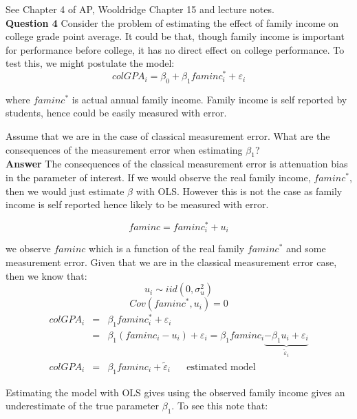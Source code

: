 \documentclass[12pt, oneside]{article}   	%
\begin{document}
See Chapter 4 of AP, Wooldridge Chapter 15 and lecture notes. \\


\indent  \textbf{Question 4 } Consider the problem of estimating the effect of family income on college grade point
average. It could be that, though family income is important for performance before
college, it has no direct effect on college performance. To test this, we might postulate
the model:\\

\[
colGPA_i =\beta_0 +\beta_1 faminc^{*}_i+\varepsilon_i
\]

where $faminc^{*}$ is actual annual family income.  Family income is self reported by students, hence
could be easily measured with error.  

Assume that we are in the case of classical measurement error. What are the consequences of the measurement error when estimating $\beta_1$?\\

\textbf{Answer} 
The consequences of the classical measurement error is attenuation bias in the parameter of interest.
If we would observe the real family income,  $faminc^{*}$, then we would just estimate $\beta$ with OLS. However this is not the case as family income is self reported hence likely to be measured with error.

\[
faminc= faminc^{*}_i+ u_i
\]


 we observe $faminc$ which is a function of the real family $faminc^{*}$ and some measurement error.
Given that we are in the classical measurement error case, then we know that:
\[
 u_{i} \sim iid (0, \sigma^{2}_u)
  \] 
 \[
  Cov (faminc^{*}, u_i)=0
 \] 
 \begin{eqnarray*}
	colGPA_i &=&  \beta_1 faminc^{*}_{i}+ \varepsilon_{i} \\
	          &=&      \beta_1 (faminc_{i} - u_{i} ) + \varepsilon_{i} = \beta_1 faminc_{i} \underbrace{- \beta_1 u_{i} + \varepsilon_{i}}_{\tilde{ \varepsilon}_{i}} \\
	 colGPA_i       &=&     \beta_1 faminc_{i} + \tilde{ \varepsilon}_{i} \;\;\;\;\;\;\text{estimated model}
 \end{eqnarray*}


Estimating the model with OLS gives using the observed family income gives an underestimate of the true parameter  $\beta_1$. To see this note that:
\end{document}
